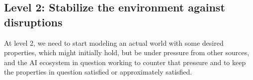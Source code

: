 \documentclass{article}
\begin{document}
\subsection{Level 2: Stabilize the environment against disruptions}

At level 2, we need to start modeling an actual world with some desired properties, which might
initially hold, but be under pressure from other sources, and the AI ecosystem in question working
to counter that pressure and to keep the properties in question satisfied or approximately satisfied.
\end{document}
